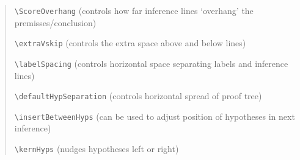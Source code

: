 \documentclass[11pt]{article}
\begin{document}
\begin{quote}
\begin{description}\setlength{\itemsep}{0.0in}
\item   \verb=\ScoreOverhang= (controls how far inference lines `overhang' the premisses/conclusion)
\item   \verb=\extraVskip= (controls the extra space above and below lines)
\item   \verb=\labelSpacing= (controls horizontal space separating labels and inference lines)
\item   \verb=\defaultHypSeparation= (controls horizontal spread of proof tree)
\item   \verb=\insertBetweenHyps= (can be used to adjust position of hypotheses in next inference)
\item    \verb=\kernHyps= (nudges hypotheses left or right)
\end{description}
\end{quote}
\end{document}
